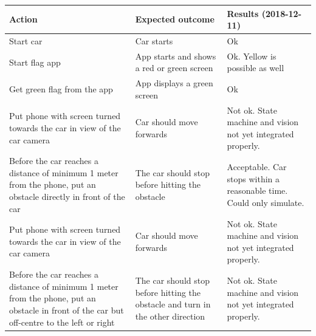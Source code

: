 \documentclass[11pt, titlepage]{article} %
\begin{document}
\begin{table}[H]
 \label{tab:title}
\centering
\begin{tabular}{|m{5cm}|m{5cm}|m{5cm}|}
\hline
Action & Expected outcome & Results (2018-12-11) \\ \hline
Start car  & Car starts      & Ok  \\ \hline
Start flag app  & 	App starts and shows a red or green screen      & Ok. Yellow is possible as well \\ \hline
Get green flag from the app  & App displays a green screen      & Ok  \\ \hline
Put phone with screen turned towards the car in view of the car camera  & Car should move forwards      & Not ok. State machine and vision not yet integrated properly.  \\ \hline
Before the car reaches a distance of minimum 1 meter from the phone, put an obstacle directly in front of the car  &  The car should stop before hitting the obstacle     & Acceptable. Car stops within a reasonable time. Could only simulate.  \\ \hline
Put phone with screen turned towards the car in view of the car camera  &  Car should move forwards     & Not ok. State machine and vision not yet integrated properly.  \\ \hline
Before the car reaches a distance of minimum 1 meter from the phone, put an obstacle in front of the car but off-centre to the left or right  & The car should stop before hitting the obstacle and turn in the other direction      & Not ok. State machine and vision not yet integrated properly.  \\ \hline

\end{tabular}
\end{table}
\end{document}
